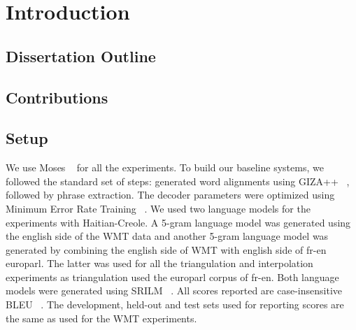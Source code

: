 
%
%

\chapter{Introduction}
\label{sec:introduction}


\section{Dissertation Outline}
\label{sec:outline}


\section{Contributions}
\label{sec:summary}



\section{Setup}
\label{sec:setup}


We use Moses ~\cite{Koehn:07} for all the experiments. To build our baseline systems, we followed the standard set of steps: generated word alignments using GIZA++ ~\cite{OchNey:03}, followed by phrase extraction. The decoder parameters were optimized using Minimum Error Rate Training ~\cite{Och:03}. We used two language models for the experiments with Haitian-Creole. A 5-gram language model was generated using the english side of the WMT data and another 5-gram language model was generated by combining the english side of WMT with english side of fr-en europarl. The latter was used for all the triangulation and interpolation experiments as triangulation used the europarl corpus of fr-en. Both  language models were generated using SRILM ~\cite{Stolcke:02}. All scores reported are case-insensitive BLEU ~\cite{Papineni:02}. The development, held-out and test sets used for reporting scores are the same as used for the WMT experiments.